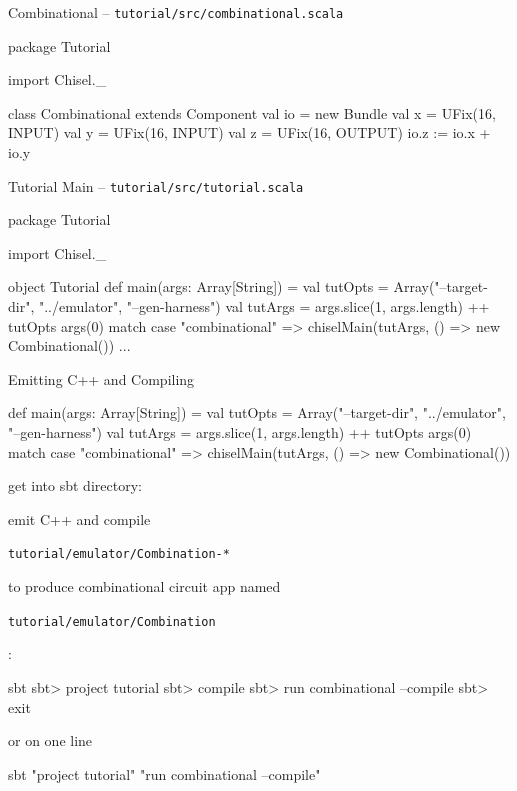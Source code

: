 \documentclass[xcolor=pdflatex,dvipsnames,table]{beamer}
\newcommand{\code}[1]{\begin{footnotesize}{\tt #1}\end{footnotesize}}
\begin{document}
\begin{frame}[fragile]{Combinational -- \tt tutorial/src/combinational.scala}
\begin{scala}
package Tutorial {

import Chisel._

class Combinational extends Component {
  val io = new Bundle {
    val x = UFix(16, INPUT)
    val y = UFix(16, INPUT)
    val z = UFix(16, OUTPUT)
  }
  io.z := io.x + io.y
}

}
\end{scala}
\end{frame}

\begin{frame}[fragile]{Tutorial Main -- \tt tutorial/src/tutorial.scala}

\begin{scala}
package Tutorial {

import Chisel._

object Tutorial {
  def main(args: Array[String]) = {
    val tutOpts = Array("--target-dir", "../emulator", "--gen-harness")
    val tutArgs = args.slice(1, args.length) ++ tutOpts
    args(0) match {
      case "combinational" => 
        chiselMain(tutArgs, () => new Combinational())
      ...
    }
  }
}

}
\end{scala}
\end{frame}


\begin{frame}[fragile]{Emitting C++ and Compiling}

{
\begin{scala}
def main(args: Array[String]) = {
  val tutOpts = Array("--target-dir", "../emulator", "--gen-harness")
  val tutArgs = args.slice(1, args.length) ++ tutOpts
  args(0) match {
    case "combinational" => chiselMain(tutArgs, () => new Combinational())
} }
\end{scala}

get into sbt directory:


emit C++ and compile \code{tutorial/emulator/Combination-*} to
produce combinational circuit app named \code{tutorial/emulator/Combination}:

\begin{scala}
sbt
sbt> project tutorial
sbt> compile
sbt> run combinational --compile
sbt> exit
\end{scala}

or on one line

\begin{scala}
sbt "project tutorial" "run combinational --compile"
\end{scala}
}
\end{frame}
\end{document}
